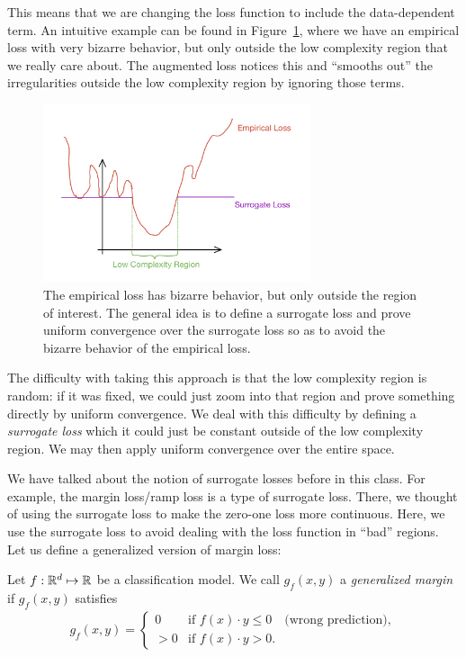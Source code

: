 This means that we are changing the loss function to include the data-dependent term. An intuitive example can be found in Figure~\ref{lec18:fig:surrogate_loss}, where we have an empirical loss with very bizarre behavior, but only outside the low complexity region that we really care about. The augmented loss notices this and ``smooths out'' the irregularities outside the low complexity region by ignoring those terms.

\begin{figure}[htpb]
    \centering
    \includegraphics[width=0.7\textwidth]{figures/surrogate_loss.jpg}
    \caption{The empirical loss has bizarre behavior, but only outside the region of interest. The general idea is to define a surrogate loss and prove uniform convergence over the surrogate loss so as to avoid the bizarre behavior of the empirical loss.}
    \label{lec18:fig:surrogate_loss}
\end{figure}

The difficulty with taking this approach is that the low complexity region is random: if it was fixed, we could just zoom into that region and prove something directly by uniform convergence. We deal with this difficulty by defining a \textit{surrogate loss} which it could just be constant outside of the low complexity region. We may then apply uniform convergence over the entire space.

We have talked about the notion of surrogate losses before in this class. For example, the margin loss/ramp loss is a type of surrogate loss. There, we thought of using the surrogate loss to make the zero-one loss more continuous. Here, we use the surrogate loss to avoid dealing with the loss function in ``bad'' regions. Let us define a generalized version of margin loss:

\begin{definition}
Let $f : \mathbb R^d \mapsto \mathbb R$ be a classification model. We call $g_f(x, y)$ a \textit{generalized margin} if $g_f(x,y)$ satisfies
\begin{align}
    g_f(x, y) = \begin{cases} 0 &\text{if } f(x)\cdot y \le 0 \quad \text{(wrong prediction)}, \\  > 0 &\text{if } f(x)\cdot y > 0. \end{cases}
\end{align}
\end{definition}

